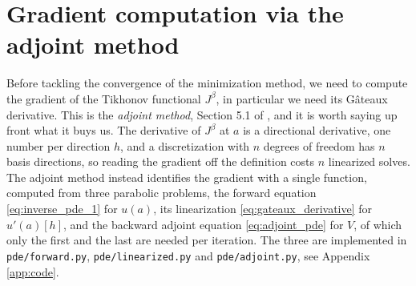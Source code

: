 \section{Gradient computation via the adjoint method}\label{sec:gradient_adjoint}

Before tackling the convergence of the minimization method,
we need to compute the gradient of the Tikhonov functional $J^\beta$,
in particular we need its Gâteaux derivative.
This is the \emph{adjoint method}, Section 5.1 of \cite{egger2005tikhonov},
and it is worth saying up front what it buys us.
The derivative of $J^\beta$ at $a$ is a directional derivative,
one number per direction $h$,
and a discretization with $n$ degrees of freedom has $n$ basis directions,
so reading the gradient off the definition costs $n$ linearized solves.
The adjoint method instead identifies the gradient with a single function,
computed from three parabolic problems,
the forward equation \eqref{eq:inverse_pde_1} for $u(a)$,
its linearization \eqref{eq:gateaux_derivative} for $u'(a)[h]$,
and the backward adjoint equation \eqref{eq:adjoint_pde} for $V$,
of which only the first and the last are needed per iteration.
The three are implemented in \texttt{pde/forward.py}, \texttt{pde/linearized.py} and
\texttt{pde/adjoint.py}, see Appendix \ref{app:code}.

